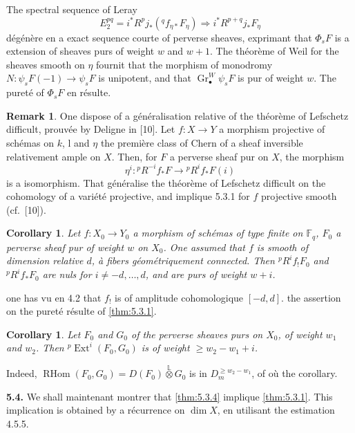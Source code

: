 \documentclass[12pt,a4paper]{article}
\theoremstyle{plain}
\newtheorem{corollary}[theorem]{Corollary}
\theoremstyle{definition}
\newtheorem{remark}[theorem]{Remark}
\DeclareMathOperator{\RHom}{RHom}
\DeclareMathOperator{\Ext}{Ext}
\DeclareMathOperator{\Gr}{Gr}
\providecommand{\Ext}{\operatorname{Ext}}
\providecommand{\RHom}{\operatorname{RHom}}
\begin{document}
{{The spectral sequence of Leray
\[
E_{2}^{pq} = i^{*}R^{p}j_{*}({}^{q}f_{\eta*}F_{\eta}) \Rightarrow i^{*}R^{p+q}j_{*}F_{\eta}
\]
d\'{e}g\'{e}n\`{e}re en a exact sequence courte of perverse sheaves, exprimant that $\Phi_{s}F$ is a extension of sheaves purs of weight $w$ and $w+1$. The th\'{e}or\`{e}me of Weil for the sheaves smooth on $\eta$ fournit that the morphism of monodromy $N: \psi_{s}F(-1) \to \psi_{s}F$ is unipotent, and that $\Gr^{W}_{\bullet}\psi_{s}F$ is pur of weight $w$. The puret\'{e} of $\Phi_{s}F$ en r\'{e}sulte.

\begin{remark}\label{rem:5.3.8}
One dispose of a g\'{e}n\'{e}ralisation relative of the th\'{e}or\`{e}me of Lefschetz difficult, prouv\'{e}e by Deligne in [10]. Let $f: X \to Y$ a morphism projective of sch\'{e}mas on $k$, l and $\eta$ the premi\`{e}re class of Chern of a sheaf inversible relativement ample on $X$. Then, for $F$ a perverse sheaf pur on $X$, the morphism
\[
\eta^{i}: {}^{p}R^{-i}f_{*}F \longrightarrow {}^{p}R^{i}f_{*}F(i)
\]
is a isomorphism. That g\'{e}n\'{e}ralise the th\'{e}or\`{e}me of Lefschetz difficult on the cohomology of a vari\'{e}t\'{e} projective, and implique 5.3.1 for $f$ projective smooth (cf.\ [10]).
\end{remark}

\begin{corollary}\label{cor:5.3.9}
Let $f: X_{0} \to Y_{0}$ a morphism of sch\'{e}mas of type finite on $\mathbb{F}_{q}$, $F_{0}$ a perverse sheaf pur of weight $w$ on $X_{0}$. One assumed that $f$ is smooth of dimension relative $d$, \`{a} fibers g\'{e}om\'{e}triquement connected. Then ${}^{p}R^{i}f_{!}F_{0}$ and ${}^{p}R^{i}f_{*}F_{0}$ are nuls for $i \neq -d,\ldots,d$, and are purs of weight $w+i$.
\end{corollary}

one has vu en 4.2 that $f_{!}$ is of amplitude cohomologique $[-d,d]$. the assertion on the puret\'{e} r\'{e}sulte of \ref{thm:5.3.1}.

\begin{corollary}\label{cor:5.3.10}
Let $F_{0}$ and $G_{0}$ of the perverse sheaves purs on $X_{0}$, of weight $w_{1}$ and $w_{2}$. Then ${}^{p}\Ext^{i}(F_{0},G_{0})$ is of weight $\geq w_{2}-w_{1}+i$.
\end{corollary}

Indeed, $\RHom(F_{0},G_{0}) = D(F_{0}) \overset{\mathbb{L}}{\otimes} G_{0}$ is in $D_{m}^{\geq w_{2}-w_{1}}$, of o\`{u} the corollary.

\noindent\textbf{5.4.} We shall maintenant montrer that \ref{thm:5.3.4} implique \ref{thm:5.3.1}. This implication is obtained by a r\'{e}currence on $\dim X$, en utilisant the estimation 4.5.5.

}}
\end{document}
